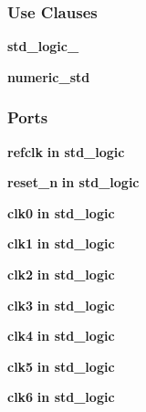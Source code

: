\subsubsection*{Use Clauses}
 \begin{DoxyCompactItemize}
\item 
{\bf std\+\_\+logic\+\_}   
\item 
{\bf numeric\+\_\+std}   
\end{DoxyCompactItemize}
\subsubsection*{Ports}
 \begin{DoxyCompactItemize}
\item 
{\bf refclk}  {\bfseries {\bfseries \textcolor{keywordflow}{in}\textcolor{vhdlchar}{ }}} {\bfseries \textcolor{comment}{std\+\_\+logic}\textcolor{vhdlchar}{ }} 
\item 
{\bf reset\+\_\+n}  {\bfseries {\bfseries \textcolor{keywordflow}{in}\textcolor{vhdlchar}{ }}} {\bfseries \textcolor{comment}{std\+\_\+logic}\textcolor{vhdlchar}{ }} 
\item 
{\bf clk0}  {\bfseries {\bfseries \textcolor{keywordflow}{in}\textcolor{vhdlchar}{ }}} {\bfseries \textcolor{comment}{std\+\_\+logic}\textcolor{vhdlchar}{ }} 
\item 
{\bf clk1}  {\bfseries {\bfseries \textcolor{keywordflow}{in}\textcolor{vhdlchar}{ }}} {\bfseries \textcolor{comment}{std\+\_\+logic}\textcolor{vhdlchar}{ }} 
\item 
{\bf clk2}  {\bfseries {\bfseries \textcolor{keywordflow}{in}\textcolor{vhdlchar}{ }}} {\bfseries \textcolor{comment}{std\+\_\+logic}\textcolor{vhdlchar}{ }} 
\item 
{\bf clk3}  {\bfseries {\bfseries \textcolor{keywordflow}{in}\textcolor{vhdlchar}{ }}} {\bfseries \textcolor{comment}{std\+\_\+logic}\textcolor{vhdlchar}{ }} 
\item 
{\bf clk4}  {\bfseries {\bfseries \textcolor{keywordflow}{in}\textcolor{vhdlchar}{ }}} {\bfseries \textcolor{comment}{std\+\_\+logic}\textcolor{vhdlchar}{ }} 
\item 
{\bf clk5}  {\bfseries {\bfseries \textcolor{keywordflow}{in}\textcolor{vhdlchar}{ }}} {\bfseries \textcolor{comment}{std\+\_\+logic}\textcolor{vhdlchar}{ }} 
\item 
{\bf clk6}  {\bfseries {\bfseries \textcolor{keywordflow}{in}\textcolor{vhdlchar}{ }}} {\bfseries \textcolor{comment}{std\+\_\+logic}\textcolor{vhdlchar}{ }} 
\item 

\end{DoxyCompactItemize}
